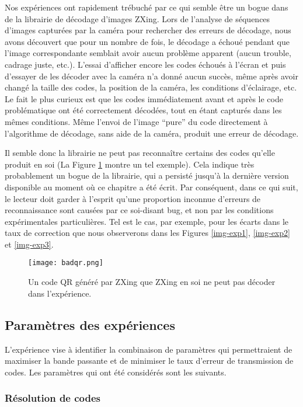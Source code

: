 Nos expériences ont rapidement trébuché par ce qui semble être un bogue dans de la librairie de décodage d'images ZXing. Lors de l'analyse de séquences d'images capturées par la caméra pour rechercher des erreurs de décodage, nous avons découvert que pour un nombre de fois, le décodage a échoué pendant que l'image correspondante semblait avoir aucun problème apparent (aucun trouble, cadrage juste, etc.). L'essai d'afficher encore les codes échoués à l'écran et puis d'essayer de les décoder avec la caméra n'a donné aucun succès, même après avoir changé la taille des codes, la position de la caméra, les conditions d'éclairage, etc. Le fait le plus curieux est que les codes immédiatement avant et après le code problématique ont été correctement décodées, tout en étant capturés dans les mêmes conditions. Même l'envoi de l'image ``pure''  du code directement à l'algorithme de décodage, sans aide de la caméra, produit une erreur de décodage.

Il semble donc la librairie ne peut pas reconnaître certains des codes qu'elle produit en soi (La Figure \ref{fig:qr:bad-code} montre un tel exemple). Cela indique très probablement un bogue de la librairie, qui a persisté jusqu'à la dernière version disponible au moment où ce chapitre a été écrit. Par conséquent, dans ce qui suit, le lecteur doit garder à l'esprit qu'une proportion inconnue d'erreurs de reconnaissance sont causées par ce soi-disant bug, et non par les conditions expérimentales particulières. Tel est le cas, par exemple, pour les écarts dans le taux de correction que nous observerons dans les Figures \ref{img-exp1}, \ref{img-exp2} et \ref{img-exp3}.

\begin{figure}
\centering
\texttt{[image: badqr.png]}
\caption{Un code QR généré par ZXing que ZXing en soi ne peut pas décoder dans l'expérience.}
\label{fig:qr:bad-code}
\end{figure}

\subsection{Paramètres des expériences}

L'expérience vise à identifier la combinaison de paramètres qui permettraient de maximiser la bande passante et de minimiser le taux d'erreur de transmission de codes. Les paramètres qui ont été considérés sont les suivants.

\subsubsection{Résolution de codes}

